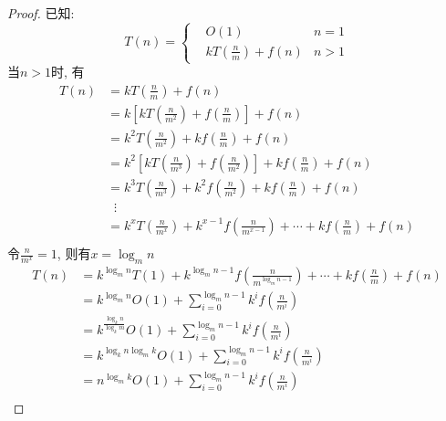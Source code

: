 \documentclass[a4paper]{ctexart}
\begin{document}
\begin{sloppypar}
    \begin{proof}
        已知:
        $$
            T(n) =
            \left\{
            \begin{aligned}
                 & O(1)                   & n =1  \\
                 & kT(\frac{n}{m}) + f(n) & n > 1
            \end{aligned}
            \right.
        $$
        当$n > 1$时, 有
        \begin{equation}
            \begin{aligned}
                \nonumber
                T(n) & = kT(\frac{n}{m}) + f(n)                                                              \\
                     & = k[kT(\frac{n}{m^2}) + f(\frac{n}{m})] +f(n)                                         \\
                     & = k^2T(\frac{n}{m^2}) + kf(\frac{n}{m}) + f(n)                                        \\
                     & = k^2[kT(\frac{n}{m^3}) + f(\frac{n}{m^2})] + kf(\frac{n}{m}) + f(n)                  \\
                     & = k^3T(\frac{n}{m^3}) + k^2f(\frac{n}{m^2}) + kf(\frac{n}{m}) + f(n)                  \\
                     & \;\;\vdots                                                                            \\
                     & = k^xT(\frac{n}{m^x}) + k^{x-1}f(\frac{n}{m^{x-1}}) + \cdots + kf(\frac{n}{m}) + f(n) \\
            \end{aligned}
        \end{equation}
        令$\frac{n}{m^x} = 1$, 则有$x = \log_{m}{n}$\\
        \begin{equation}
            \begin{aligned}
                \nonumber
                T(n) & = k^{\log_{m}{n}}T(1) + k^{\log_{m}{n}-1}f(\frac{n}{m^{\log_{m}{n}-1}}) + \cdots + kf(\frac{n}{m}) + f(n) \\
                     & = k^{\log_{m}{n}}O(1) + \sum_{i=0}^{\log_{m}{n}-1}k^if(\frac{n}{m^i})                                     \\
                     & = k^{\frac{\log_{k}{n}}{\log_{k}{m}}}O(1) + \sum_{i=0}^{\log_{m}{n}-1}k^if(\frac{n}{m^i})                 \\
                     & = k^{\log_{k}{n}\log_{m}{k}}O(1) + \sum_{i=0}^{\log_{m}{n}-1}k^if(\frac{n}{m^i})                          \\
                     & = n^{\log_{m}{k}}O(1) + \sum_{i=0}^{\log_{m}{n}-1}k^if(\frac{n}{m^i})                                     \\
            \end{aligned}
        \end{equation}
    \end{proof}
\end{sloppypar}
\end{document}
